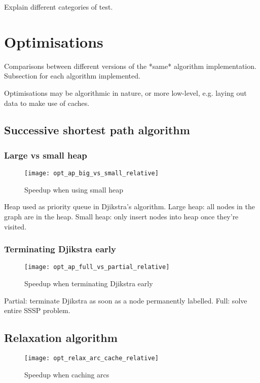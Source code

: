Explain different categories of test.

\section{Optimisations} \label{sec:eval-optimisations}

Comparisons between different versions of the *same* algorithm implementation. Subsection for each algorithm implemented.

Optimisations may be algorithmic in nature, or more low-level, e.g. laying out data to make use of caches.

\subsection{Successive shortest path algorithm}

\subsubsection{Large vs small heap}

\begin{figure}
  \centering
  \texttt{[image: opt\_ap\_big\_vs\_small\_relative]}
  \caption{Speedup when using small heap}
  \label{fig:opt-ap-big-vs-small}
\end{figure}

Heap used as priority queue in Djikstra's algorithm. Large heap: all nodes in the graph are in the heap. Small heap: only insert nodes into heap once they're visited.

\subsubsection{Terminating Djikstra early}

\begin{figure}
    \centering
    \texttt{[image: opt\_ap\_full\_vs\_partial\_relative]}
    \caption{Speedup when terminating Djikstra early}
    \label{fig:opt-ap-terminate-djikstra-early}
\end{figure}

Partial: terminate Djikstra as soon as a node permanently labelled. Full: solve entire SSSP problem.

\subsection{Relaxation algorithm}

\begin{figure}
    \centering
    \texttt{[image: opt\_relax\_arc\_cache\_relative]}
    \caption{Speedup when caching arcs}
    \label{fig:opt-relax-cache-arcs}
\end{figure}

